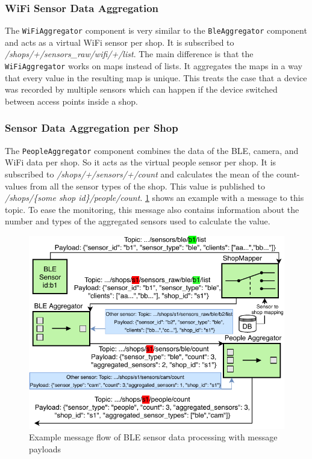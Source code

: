 \documentclass[runningheads]{llncs}
\newcommand{\topicname}[1]{\textit{#1}}
\newcommand{\componentname}[1]{\texttt{#1}}
\begin{document}
\subsubsection{WiFi Sensor Data Aggregation}
\label{impl:wifi-aggr}
The \componentname{WiFiAggregator} component is very similar to the \componentname{Ble\-Aggregator} component and acts as a virtual WiFi sensor per shop. It is subscribed to \topicname{/shops/+\allowbreak/sensors\_raw\allowbreak/wifi\allowbreak/+/list}. The main difference is that the \componentname{WiFi\-Aggregator} works on maps instead of lists. It aggregates the maps in a way that every value in the resulting map is unique. This treats the case that a device was recorded by multiple sensors which can happen if the device switched between access points inside a shop.


\subsubsection{Sensor Data Aggregation per Shop}
\label{impl:people-aggr}
The \componentname{PeopleAggregator} component combines the data of the BLE, camera, and WiFi data per shop. So it acts as the virtual people sensor per shop. It is subscribed to \topicname{/shops/+/sensors\allowbreak/+/count} and calculates the mean of the count-values from all the sensor types of the shop. This value is published to \topicname{/shops/\{some shop id\}\allowbreak/people/count}.
\cref{fig:preprocessing_example} shows an example with a message to this topic. To ease the monitoring, this message also contains information about the number and types of the aggregated sensors used to calculate the value.

\begin{figure}
    \centering
    \includegraphics[width=0.9\linewidth]{assets/sensor/preprocessing_ble_payload.pdf}
    \caption{Example message flow of BLE sensor data processing with message payloads}
    \label{fig:preprocessing_example}
\end{figure}
\end{document}

